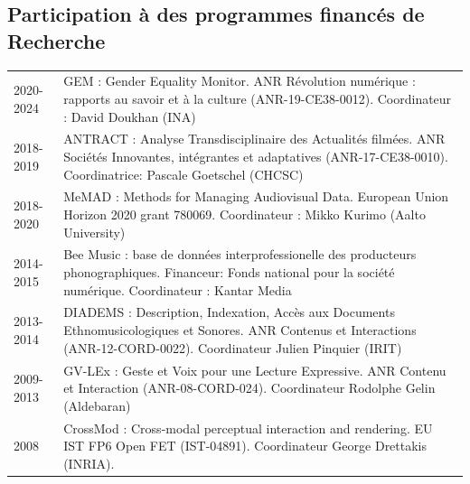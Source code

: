 \begin{fr}
\subsection{Participation à des programmes financés de Recherche}
\begin{tabularx}{\linewidth}{@{}l X@{}}
2020-2024 & GEM : Gender Equality Monitor. ANR Révolution numérique : rapports au savoir et à la culture (ANR-19-CE38-0012). Coordinateur : David Doukhan (INA)\\
2018-2019 & ANTRACT : Analyse Transdisciplinaire des Actualités filmées. ANR Sociétés Innovantes, intégrantes et adaptatives (ANR-17-CE38-0010). Coordinatrice: Pascale Goetschel (CHCSC)\\
2018-2020 & MeMAD : Methods for Managing Audiovisual Data. European Union Horizon 2020 grant 780069. Coordinateur : Mikko Kurimo (Aalto University)\\
2014-2015 & Bee Music : base de données interprofessionelle des producteurs phonographiques. Financeur: Fonds national pour la société numérique. Coordinateur : Kantar Media\\
2013-2014 & DIADEMS : Description, Indexation, Accès aux Documents Ethnomusicologiques et Sonores. ANR Contenus et Interactions (ANR-12-CORD-0022). Coordinateur Julien Pinquier (IRIT)\\
2009-2013 & GV-LEx : Geste et Voix pour une Lecture Expressive. ANR Contenu et Interaction (ANR-08-CORD-024). Coordinateur Rodolphe Gelin (Aldebaran)\\
2008 & CrossMod : Cross-modal perceptual interaction and rendering. EU IST FP6 Open FET (IST-04891). Coordinateur George Drettakis (INRIA).\\
\end{tabularx}
\end{fr}


